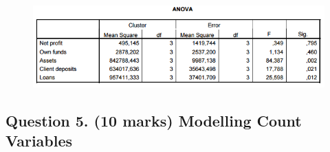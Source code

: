 \documentclass[a4paper,12pt]{article}
\begin{document}
\begin{figure}[h!]
\centering
\includegraphics[width=1.1\linewidth]{ANOVA}
\caption{}
\label{fig:ANOVA}
\end{figure}


\newpage

\subsection*{Question 5. (10 marks) Modelling Count Variables }
\end{document}
